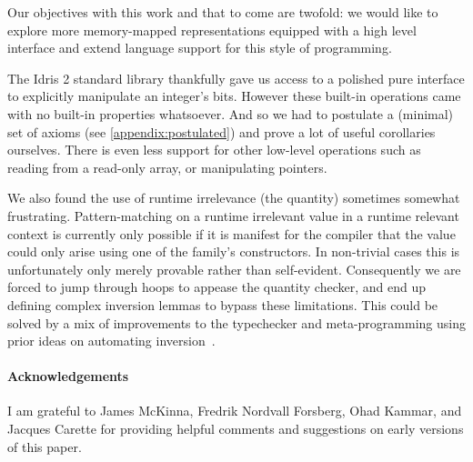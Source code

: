 \documentclass{article}
\newcommand{\idris}{Idris 2}
\begin{document}
Our objectives with this work and that to come are twofold: we would like to
explore more memory-mapped representations equipped with a high level interface
and extend language support for this style of programming.

The \idris{} standard library thankfully gave us access to a polished pure interface
to explicitly manipulate an integer's bits.
%
However these built-in operations came with no built-in properties whatsoever.
%
And so we had to postulate a (minimal) set of axioms (see \cref{appendix:postulated})
and prove a lot of useful corollaries ourselves.
%
There is even less support for other low-level operations such as reading from
a read-only array, or manipulating pointers.

We also found the use of runtime irrelevance (the  quantity)
sometimes somewhat frustrating.
%
Pattern-matching on a runtime irrelevant value in a runtime relevant context
is currently only possible if it is manifest for the compiler that the value
could only arise using one of the family's constructors.
%
In non-trivial cases this is unfortunately only merely provable rather than
self-evident.
%
Consequently we are forced to jump through hoops to appease the quantity
checker, and end up defining complex inversion lemmas to bypass these
limitations.
%
This could be solved by a mix of improvements to the typechecker and
meta-programming using prior ideas on automating
inversion~\cite{DBLP:conf/types/CornesT95,DBLP:conf/types/McBride96,monin:inria-00489412}.


\paragraph{Acknowledgements}
I am grateful to
James McKinna,
Fredrik Nordvall Forsberg,
Ohad Kammar,
and Jacques Carette
for providing helpful comments and suggestions on early
versions of this paper.



\appendix



\end{document}
